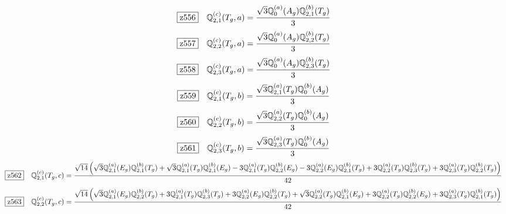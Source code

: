 \documentclass[fleqn,10pt,landscape]{jsarticle}
\begin{document}
\begin{dmath*}
\hspace*{3mm}\fbox{z556}\quad \mathbb{Q}_{2,1}^{(c)}(T_{g},a)=\frac{\sqrt{3} \mathbb{Q}_{0}^{(a)}(A_{g}) \mathbb{Q}_{2,1}^{(b)}(T_{g})}{3}
\end{dmath*}
\begin{dmath*}
\hspace*{3mm}\fbox{z557}\quad \mathbb{Q}_{2,2}^{(c)}(T_{g},a)=\frac{\sqrt{3} \mathbb{Q}_{0}^{(a)}(A_{g}) \mathbb{Q}_{2,2}^{(b)}(T_{g})}{3}
\end{dmath*}
\begin{dmath*}
\hspace*{3mm}\fbox{z558}\quad \mathbb{Q}_{2,3}^{(c)}(T_{g},a)=\frac{\sqrt{3} \mathbb{Q}_{0}^{(a)}(A_{g}) \mathbb{Q}_{2,3}^{(b)}(T_{g})}{3}
\end{dmath*}
\begin{dmath*}
\hspace*{3mm}\fbox{z559}\quad \mathbb{Q}_{2,1}^{(c)}(T_{g},b)=\frac{\sqrt{3} \mathbb{Q}_{2,1}^{(a)}(T_{g}) \mathbb{Q}_{0}^{(b)}(A_{g})}{3}
\end{dmath*}
\begin{dmath*}
\hspace*{3mm}\fbox{z560}\quad \mathbb{Q}_{2,2}^{(c)}(T_{g},b)=\frac{\sqrt{3} \mathbb{Q}_{2,2}^{(a)}(T_{g}) \mathbb{Q}_{0}^{(b)}(A_{g})}{3}
\end{dmath*}
\begin{dmath*}
\hspace*{3mm}\fbox{z561}\quad \mathbb{Q}_{2,3}^{(c)}(T_{g},b)=\frac{\sqrt{3} \mathbb{Q}_{2,3}^{(a)}(T_{g}) \mathbb{Q}_{0}^{(b)}(A_{g})}{3}
\end{dmath*}
\begin{dmath*}
\hspace*{3mm}\fbox{z562}\quad \mathbb{Q}_{2,1}^{(c)}(T_{g},c)=\frac{\sqrt{14} \left(\sqrt{3} \mathbb{Q}_{2,1}^{(a)}(E_{g}) \mathbb{Q}_{2,1}^{(b)}(T_{g}) + \sqrt{3} \mathbb{Q}_{2,1}^{(a)}(T_{g}) \mathbb{Q}_{2,1}^{(b)}(E_{g}) - 3 \mathbb{Q}_{2,1}^{(a)}(T_{g}) \mathbb{Q}_{2,2}^{(b)}(E_{g}) - 3 \mathbb{Q}_{2,2}^{(a)}(E_{g}) \mathbb{Q}_{2,1}^{(b)}(T_{g}) + 3 \mathbb{Q}_{2,2}^{(a)}(T_{g}) \mathbb{Q}_{2,3}^{(b)}(T_{g}) + 3 \mathbb{Q}_{2,3}^{(a)}(T_{g}) \mathbb{Q}_{2,2}^{(b)}(T_{g})\right)}{42}
\end{dmath*}
\begin{dmath*}
\hspace*{3mm}\fbox{z563}\quad \mathbb{Q}_{2,2}^{(c)}(T_{g},c)=\frac{\sqrt{14} \left(\sqrt{3} \mathbb{Q}_{2,1}^{(a)}(E_{g}) \mathbb{Q}_{2,2}^{(b)}(T_{g}) + 3 \mathbb{Q}_{2,1}^{(a)}(T_{g}) \mathbb{Q}_{2,3}^{(b)}(T_{g}) + 3 \mathbb{Q}_{2,2}^{(a)}(E_{g}) \mathbb{Q}_{2,2}^{(b)}(T_{g}) + \sqrt{3} \mathbb{Q}_{2,2}^{(a)}(T_{g}) \mathbb{Q}_{2,1}^{(b)}(E_{g}) + 3 \mathbb{Q}_{2,2}^{(a)}(T_{g}) \mathbb{Q}_{2,2}^{(b)}(E_{g}) + 3 \mathbb{Q}_{2,3}^{(a)}(T_{g}) \mathbb{Q}_{2,1}^{(b)}(T_{g})\right)}{42}
\end{dmath*}
\end{document}
